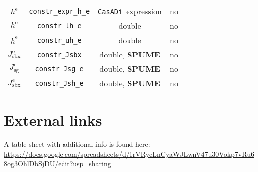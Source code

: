 \documentclass[
a4paper, %
10pt, %
notitlepage,
english]{CSUniSchoolLabReport}
\newcommand{\code}[1]{\texttt{#1}}
\newcommand{\casadi}{\texttt{CasADi}}
\newcommand{\ind}[1]{_{\textrm{#1}}}
\newcommand{\terminal}{^{\textrm{e}}}
\newcommand{\optional}{no}
\begin{document}
\begin{appendices}
\begin{table}[h!]
\begin{tabular}{cccc}
		$ h\terminal $ & \code{constr\_expr\_h\_e}    & \casadi~expression   & \optional  \\
		$\underline{h}\terminal $    & \code{constr\_lh\_e}     & double   & \optional   \\
		$\bar{h}\terminal $         & \code{constr\_uh\_e}     & double  & \optional   \\ [1em]
		$ J\ind{sbx}\terminal $ & \code{constr\_Jsbx} & double, \textbf{SPUME}   & \optional \\
		$ J\ind{sg}\terminal $ & \code{constr\_Jsg\_e} & double, \textbf{SPUME} & \optional  \\
		$ J\ind{sbx}\terminal $ & \code{constr\_Jsh\_e} & double, \textbf{SPUME}  & \optional  \\
		\bottomrule
	\end{tabular}
\end{table}
%
\section{External links}\label{sec:external_links}
%
A table sheet with additional info is found here:\newline
\url{https://docs.google.com/spreadsheets/d/1rVRycLnCyaWJLwnV47u30Vokp7vRu68og3OhlDbSjDU/edit?usp=sharing}
%

\end{appendices}
\end{document}

